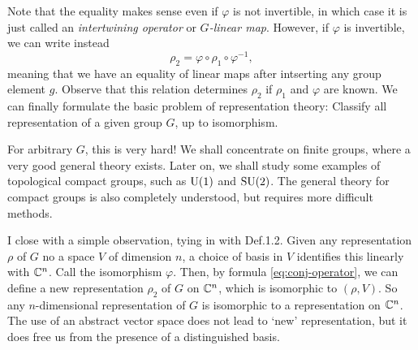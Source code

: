 Note that the equality makes sense even if \(\varphi\) is not invertible,
in which case it is just called an \emph{intertwining operator} or
\emph{\(G\)-linear map}. However, if \(\varphi\) is invertible, we can
write instead
\begin{equation}
  \label{eq:conj-operator}
  \rho_2=\varphi\circ\rho_1\circ\varphi^{-1},
\end{equation}
meaning that we have an equality of linear maps after intserting any group
element \(g\). Observe that this relation determines \(\rho_2\) if
\(\rho_1\) and \(\varphi\) are known. We can finally formulate the basic
problem of representation theory: Classify all representation of a given
group \(G\), up to isomorphism.

For arbitrary \(G\), this is very hard! We shall concentrate on finite
groups, where a very good general theory exists. Later on, we shall study
some examples of topological compact groups, such as \(\operatorname{U}(1)\) and
\(\operatorname{SU}(2)\). The general theory for compact groups is also completely
understood, but requires more difficult methods.

I close with a simple observation, tying in with Def.\@ 1.2. Given any
representation \(\rho\) of \(G\) no a space \(V\) of dimension \(n\), a
choice of basis in \(V\) identifies this linearly with \(\mathbb{C}^n\). Call the
isomorphism \(\varphi\). Then, by formula \eqref{eq:conj-operator}, we can
define a new representation \(\rho_2\) of \(G\) on \(\mathbb{C}^n\), which is
isomorphic to \((\rho,V)\). So any \(n\)-dimensional representation of
\(G\) is isomorphic to a representation on \(\mathbb{C}^n\). The use of an
abstract vector space does not lead to `new' representation, but it does
free us from the presence of a distinguished basis.

